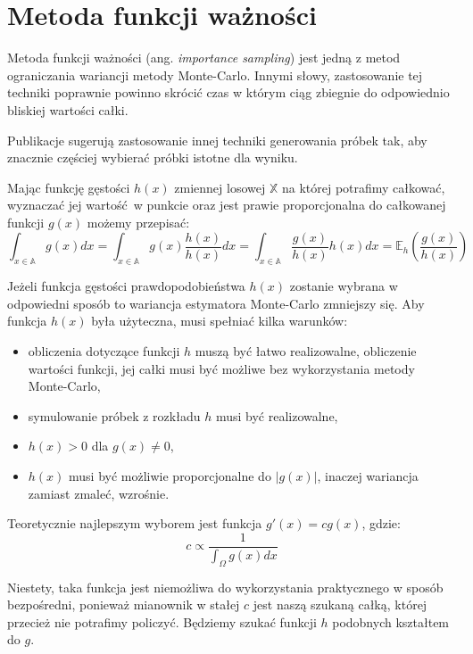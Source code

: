 \documentclass[../main.tex]{subfiles}
\begin{document}
\section{Metoda funkcji ważności}

Metoda funkcji ważności (ang. \textit{importance sampling}) jest jedną z metod ograniczania wariancji metody
Monte-Carlo. Innymi słowy, zastosowanie tej techniki poprawnie powinno
skrócić czas w którym ciąg zbiegnie do odpowiednio bliskiej wartości całki.

Publikacje \cite{Veach,MonteCarloAnderson} sugerują zastosowanie innej techniki generowania próbek tak, aby znacznie częściej wybierać próbki istotne dla wyniku.

Mając funkcję gęstości $h(x)$ zmiennej losowej $\mathbb{X}$ na której potrafimy całkować, wyznaczać jej wartość w punkcie oraz jest prawie proporcjonalna do całkowanej funkcji $g(x)$ możemy przepisać:
\[
  \int_{x \in \mathbb{A}} { g(x) dx } =
  \int_{x \in \mathbb{A}} { g(x) \frac{h(x)}{h(x)} dx } =
  \int_{x \in \mathbb{A}} { \frac{g(x)}{h(x)} h(x) dx } =
  \mathbb{E}_{h}\left({ \frac{g(x)}{h(x)} }\right)
\]

Jeżeli funkcja gęstości prawdopodobieństwa $h(x)$ zostanie wybrana w odpowiedni sposób to wariancja estymatora Monte-Carlo zmniejszy się. Aby funkcja $h(x)$ była użyteczna, musi spełniać kilka warunków:

\begin{itemize}

  \item obliczenia dotyczące funkcji $h$ muszą być łatwo realizowalne, obliczenie wartości funkcji, jej całki musi być możliwe bez wykorzystania metody Monte-Carlo,

  \item symulowanie próbek z rozkładu $h$ musi być realizowalne,

  \item $h(x) > 0$ dla $g(x) \neq 0$,

  \item $h(x)$ musi być możliwie proporcjonalne do $|g(x)|$, inaczej wariancja zamiast zmaleć, wzrośnie.

\end{itemize}

Teoretycznie najlepszym wyborem jest funkcja $g'(x) = cg(x)$, gdzie:
\[
	c \propto \frac{1}{\int_{\Omega}{g(x)dx}}
\]

\noindent Niestety, taka funkcja jest niemożliwa do wykorzystania praktycznego w sposób bezpośredni, ponieważ mianownik w stałej $c$ jest naszą szukaną całką, której przecież nie potrafimy policzyć. Będziemy szukać funkcji $h$ podobnych kształtem do $g$.
\end{document}
